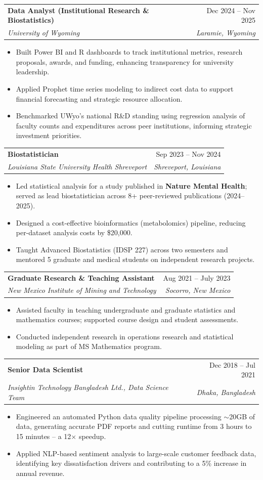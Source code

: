 \documentclass[letterpaper,10.9pt]{article}
\makeatletter
\newcommand{\resumeItem}[1]{
  \item\small{
    {#1 \vspace{-5pt}}
  }
}
\newcommand{\resumeSubheading}[4]{
  \vspace{-1pt}\item
    \begin{tabular*}{0.97\textwidth}[t]{l@{\extracolsep{\fill}}r}
      \textbf{#1} & #2 \\
      \textit{\small#3} & \textit{\small #4} \\
    \end{tabular*}\vspace{-7pt}
}
\newcommand{\resumeItemListStart}{\begin{itemize}}
\newcommand{\resumeItemListEnd}{\end{itemize}\vspace{-5pt}}
\makeatother
\begin{document}
  \resumeSubheading
      {Data Analyst (Institutional Research \& Biostatistics)}{Dec 2024 -- Nov 2025}
      {University of Wyoming}{Laramie, Wyoming}
      \resumeItemListStart
        \resumeItem{Built Power BI and R dashboards to track institutional metrics, research proposals, awards, and funding, enhancing transparency for university leadership.}
        \resumeItem{Applied Prophet time series modeling to indirect cost data to support financial forecasting and strategic resource allocation.}
        \resumeItem{Benchmarked UWyo's national R\&D standing using regression analysis of faculty counts and expenditures across peer institutions, informing strategic investment priorities.}
      \resumeItemListEnd

    \resumeSubheading
      {Biostatistician}{Sep 2023 -- Nov 2024}
      {Louisiana State University Health Shreveport}{Shreveport, Louisiana}
      \resumeItemListStart
        \resumeItem{Led statistical analysis for a study published in \textbf{Nature Mental Health}; served as lead biostatistician across 8+ peer-reviewed publications (2024--2025).}
        \resumeItem{Designed a cost-effective bioinformatics (metabolomics) pipeline, reducing per-dataset analysis costs by \$20,000.}
        \resumeItem{Taught Advanced Biostatistics (IDSP 227) across two semesters and mentored 5 graduate and medical students on independent research projects.}
      \resumeItemListEnd

    \resumeSubheading
      {Graduate Research \& Teaching Assistant}{Aug 2021 -- July 2023}
      {New Mexico Institute of Mining and Technology}{Socorro, New Mexico}
      \resumeItemListStart
        \resumeItem{Assisted faculty in teaching undergraduate and graduate statistics and mathematics courses; supported course design and student assessments.}
        \resumeItem{Conducted independent research in operations research and statistical modeling as part of MS Mathematics program.}
      \resumeItemListEnd

    \resumeSubheading
      {Senior Data Scientist}{Dec 2018 -- Jul 2021}
      {Insightin Technology Bangladesh Ltd., Data Science Team}{Dhaka, Bangladesh}
      \resumeItemListStart
        \resumeItem{Engineered an automated Python data quality pipeline processing $\sim$20GB of data, generating accurate PDF reports and cutting runtime from 3 hours to 15 minutes -- a 12$\times$ speedup.}
        \resumeItem{Applied NLP-based sentiment analysis to large-scale customer feedback data, identifying key dissatisfaction drivers and contributing to a 5\% increase in annual revenue.}
      \resumeItemListEnd
\end{document}
